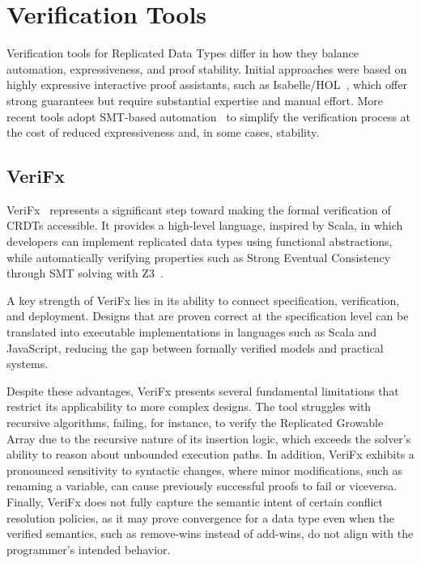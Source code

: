 \section{Verification Tools}
\label{sec:tools}

Verification tools for Replicated Data Types differ in how they balance automation, expressiveness, and proof stability. Initial approaches were based on highly expressive interactive proof assistants, such as Isabelle/HOL~\cite{isabelle}, which offer strong guarantees but require substantial expertise and manual effort. More recent tools adopt SMT-based automation~\cite{porre2023masses} to simplify the verification process at the cost of reduced expressiveness and, in some cases, stability.

\subsection{VeriFx}
\label{sub:verifx}

VeriFx~\cite{porre2023masses} represents a significant step toward making the formal verification of CRDTs accessible. It provides a high-level language, inspired by Scala, in which developers can implement replicated data types using functional abstractions, while automatically verifying properties such as Strong Eventual Consistency through SMT solving with Z3~\cite{z3}.

A key strength of VeriFx lies in its ability to connect specification, verification, and deployment. Designs that are proven correct at the specification level can be translated into executable implementations in languages such as Scala and JavaScript, reducing the gap between formally verified models and practical systems.

Despite these advantages, VeriFx presents several fundamental limitations that restrict its applicability to more complex designs. The tool struggles with recursive algorithms, failing, for instance, to verify the Replicated Growable Array due to the recursive nature of its insertion logic, which exceeds the solver’s ability to reason about unbounded execution paths. In addition, VeriFx exhibits a pronounced sensitivity to syntactic changes, where minor modifications, such as renaming a variable, can cause previously successful proofs to fail or viceversa. Finally, VeriFx does not fully capture the semantic intent of certain conflict resolution policies, as it may prove convergence for a data type even when the verified semantics, such as remove-wins instead of add-wins, do not align with the programmer’s intended behavior.


